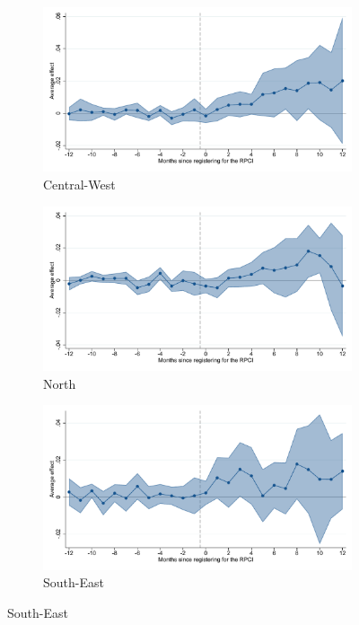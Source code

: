 \begin{figure}[H]
    \begin{subfigure}{0.32\textwidth}
    \caption{Central-West}
    \includegraphics[width=\textwidth]{04_Figures/muestra_10porciento/event_study_log_sal_cierre_reg_centro_occ_dcdh_connected.pdf}
    \end{subfigure}
    \begin{subfigure}{0.32\textwidth}
    \caption{North}
    \includegraphics[width=\textwidth]{04_Figures/muestra_10porciento/event_study_log_sal_cierre_reg_norte_dcdh_connected.pdf}
    \end{subfigure}
    \begin{subfigure}{0.32\textwidth}
    \caption{South-East}
    \includegraphics[width=\textwidth]{04_Figures/muestra_10porciento/event_study_log_sal_cierre_reg_sur_dcdh_connected.pdf}
    \end{subfigure}


\end{figure}
